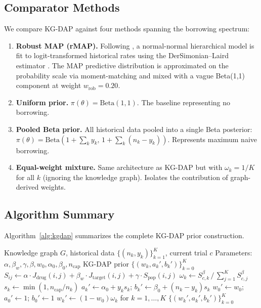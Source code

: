 \documentclass[12pt]{article}
\newcommand{\Jdrug}{J_{\mathrm{drug}}}
\newcommand{\Jtarget}{J_{\mathrm{target}}}
\newcommand{\Spop}{S_{\mathrm{pop}}}
\begin{document}
\subsection{Comparator Methods}
\label{sec:comparators}

We compare KG-DAP against four methods spanning the borrowing spectrum:

\begin{enumerate}
\item \textbf{Robust MAP (rMAP).} Following \citet{schmidli2014robust}, a normal-normal hierarchical model is fit to logit-transformed historical rates using the DerSimonian--Laird estimator \citep{dersimonian1986meta}. The MAP predictive distribution is approximated on the probability scale via moment-matching and mixed with a vague Beta(1,1) component at weight $w_{\mathrm{rob}} = 0.20$.

\item \textbf{Uniform prior.} $\pi(\theta) = \mathrm{Beta}(1, 1)$. The baseline representing no borrowing.

\item \textbf{Pooled Beta prior.} All historical data pooled into a single Beta posterior: $\pi(\theta) = \mathrm{Beta}(1 + \sum_k y_k, \, 1 + \sum_k (n_k - y_k))$. Represents maximum naive borrowing.

\item \textbf{Equal-weight mixture.} Same architecture as KG-DAP but with $\omega_k = 1/K$ for all $k$ (ignoring the knowledge graph). Isolates the contribution of graph-derived weights.
\end{enumerate}

\subsection{Algorithm Summary}

Algorithm~\ref{alg:kgdap} summarizes the complete KG-DAP prior construction.

\begin{algorithm}[t]
\caption{KG-DAP Prior Construction}
\label{alg:kgdap}
\begin{algorithmic}[1]
\Require Knowledge graph $G$, historical data $\{(n_k, y_k)\}_{k=1}^K$, current trial $c$
\Require Parameters: $\alpha, \beta_w, \gamma, \beta, w_0, \alpha_0, \beta_0, n_{\mathrm{cap}}$
\Ensure KG-DAP prior $\{(w_k, a_k', b_k')\}_{k=0}^K$
    \State $S_{ij} \gets \alpha \cdot \Jdrug(i,j) + \beta_w \cdot \Jtarget(i,j) + \gamma \cdot \Spop(i,j)$
\EndFor
{}
    \State $\omega_k \gets S_{c,k}^\beta \,/\, \sum_{j=1}^K S_{c,j}^\beta$ 
\EndFor
{}
    \State $s_k \gets \min(1, n_{\mathrm{cap}} / n_k)$ 
    \State $a_k' \gets \alpha_0 + y_k s_k$; \quad $b_k' \gets \beta_0 + (n_k - y_k) s_k$
\EndFor
\State $w_0' \gets w_0$; \quad $a_0' \gets 1$; \quad $b_0' \gets 1$ 
\State $w_k' \gets (1 - w_0) \omega_k$ for $k = 1, \ldots, K$ 
\State \Return $\{(w_k', a_k', b_k')\}_{k=0}^K$
\end{algorithmic}
\end{algorithm}
\end{document}
